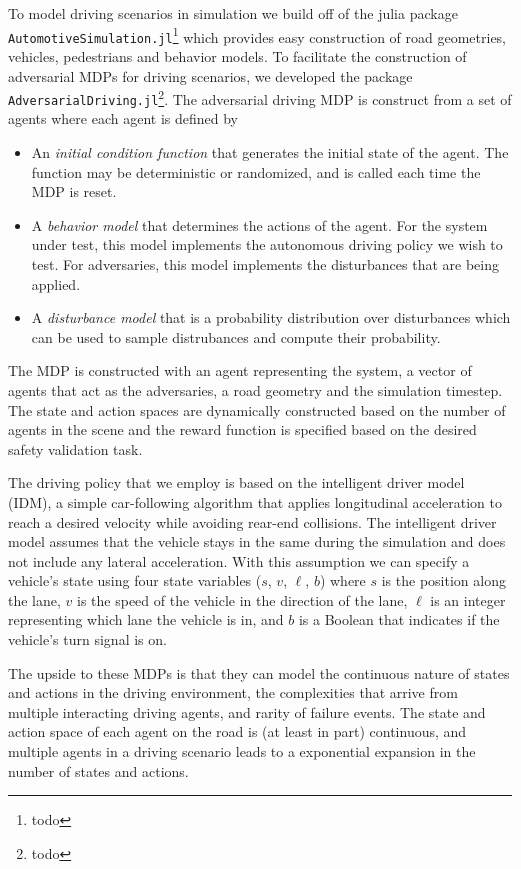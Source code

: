 To model driving scenarios in simulation we build off of the julia package \texttt{AutomotiveSimulation.jl}\footnote{todo} which provides easy construction of road geometries, vehicles, pedestrians and behavior models. To facilitate the construction of adversarial MDPs for driving scenarios, we developed the package \texttt{AdversarialDriving.jl}\footnote{todo}. The adversarial driving MDP is construct from a set of agents where each agent is defined by
\begin{itemize}
    \item An \emph{initial condition function} that generates the initial state of the agent. The function may be deterministic or randomized, and is called each time the MDP is reset. 
    \item A \emph{behavior model} that determines the actions of the agent. For the system under test, this model implements the autonomous driving policy we wish to test. For adversaries, this model implements the disturbances that are being applied.
    \item A \emph{disturbance model} that is a probability distribution over disturbances which can be used to sample distrubances and compute their probability. 
\end{itemize}
The MDP is constructed with an agent representing the system, a vector of agents that act as the adversaries, a road geometry and the simulation timestep. The state and action spaces are dynamically constructed based on the number of agents in the scene and the reward function is specified based on the desired safety validation task. 




The driving policy that we employ is based on the intelligent driver model (IDM), a simple car-following algorithm that applies longitudinal acceleration to reach a desired velocity while avoiding rear-end collisions. 
The intelligent driver model assumes that the vehicle stays in the same during the simulation and does not include any lateral acceleration. With this assumption we can specify a vehicle's state using four state variables ($s$, $v$, $\ell$, $b$) where $s$ is the position along the lane, $v$ is the speed of the vehicle in the direction of the lane, $\ell$ is an integer representing which lane the vehicle is in, and $b$ is a Boolean that indicates if the vehicle's turn signal is on.

The upside to these MDPs is that they can model the continuous nature of states and actions in the driving environment, the complexities that arrive from multiple interacting driving agents, and rarity of failure events. The state and action space of each agent on the road is (at least in part) continuous, and multiple agents in a driving scenario leads to a exponential expansion in the number of states and actions. 

